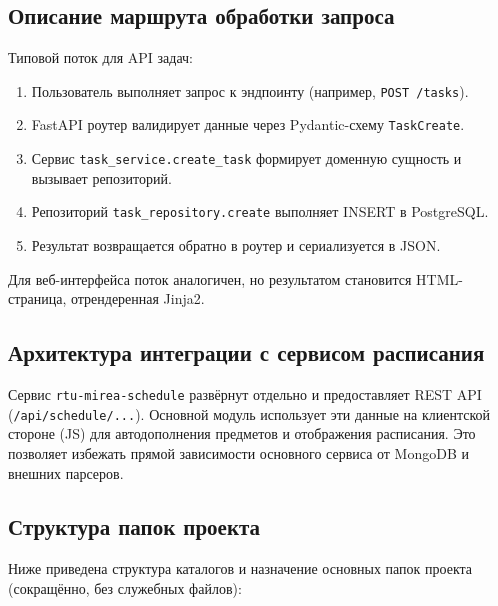 \subsection{Описание маршрута обработки запроса}

Типовой поток для API задач:
\begin{enumerate}
    \item Пользователь выполняет запрос к эндпоинту (например, \texttt{POST /tasks}).
    \item FastAPI роутер валидирует данные через Pydantic-схему \texttt{TaskCreate}.
    \item Сервис \texttt{task\_service.create\_task} формирует доменную сущность и вызывает репозиторий.
    \item Репозиторий \texttt{task\_repository.create} выполняет INSERT в PostgreSQL.
    \item Результат возвращается обратно в роутер и сериализуется в JSON.
\end{enumerate}

Для веб-интерфейса поток аналогичен, но результатом становится HTML-страница, отрендеренная Jinja2.

\subsection{Архитектура интеграции с сервисом расписания}

Сервис \texttt{rtu-mirea-schedule} развёрнут отдельно и предоставляет REST API (\texttt{/api/schedule/...}). Основной модуль использует эти данные на клиентской стороне (JS) для автодополнения предметов и отображения расписания. Это позволяет избежать прямой зависимости основного сервиса от MongoDB и внешних парсеров.

\subsection{Структура папок проекта}

Ниже приведена структура каталогов и назначение основных папок проекта (сокращённо, без служебных файлов):

